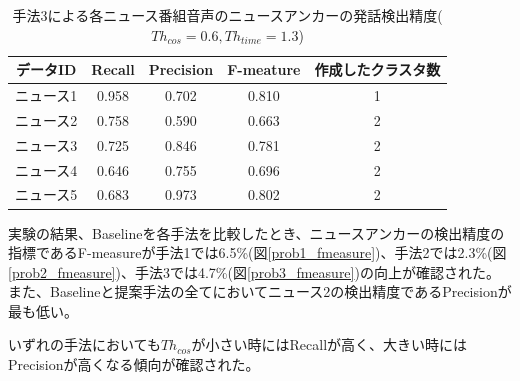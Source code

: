 \begin{table}[H]
  \begin{center}
    \caption{手法3による各ニュース番組音声のニュースアンカーの発話検出精度($Th_{cos}=0.6,Th_{time}=1.3$) \label{table:prob3_eachnews}}
    \begin{tabular}{|c||c|c|c|c|} \hline
データID & Recall & Precision & F-meature & 作成したクラスタ数\\ \hline
ニュース1 & 0.958 & 0.702 & 0.810 & 1 \\ \hline
ニュース2 & 0.758 & 0.590 & 0.663 & 2 \\ \hline
ニュース3 & 0.725 & 0.846 & 0.781 & 2 \\ \hline
ニュース4 & 0.646 & 0.755 & 0.696 & 2 \\ \hline
ニュース5 & 0.683 & 0.973 & 0.802 & 2 \\ \hline
    \end{tabular}
  \end{center}
\end{table}

実験の結果、Baselineを各手法を比較したとき、ニュースアンカーの検出精度の指標であるF-measureが手法1では6.5\%(図\ref{prob1_fmeasure})、手法2では2.3\%(図\ref{prob2_fmeasure})、手法3では4.7\%(図\ref{prob3_fmeasure})の向上が確認された。また、Baselineと提案手法の全てにおいてニュース2の検出精度であるPrecisionが最も低い。\par
いずれの手法においても$Th_{cos}$が小さい時にはRecallが高く、大きい時にはPrecisionが高くなる傾向が確認された。\par

